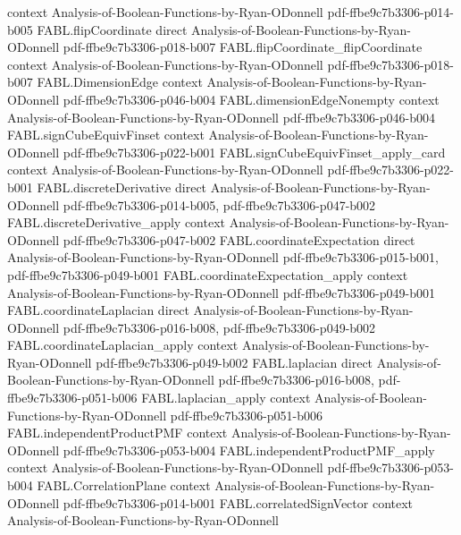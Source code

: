 \begin{theorem}
  {context}
  {Analysis-of-Boolean-Functions-by-Ryan-ODonnell}
  {pdf-ffbe9c7b3306-p014-b005}
\proofstep
  {FABL.flipCoordinate}
  {direct}
  {Analysis-of-Boolean-Functions-by-Ryan-ODonnell}
  {pdf-ffbe9c7b3306-p018-b007}
\proofstep
  {FABL.flipCoordinate_flipCoordinate}
  {context}
  {Analysis-of-Boolean-Functions-by-Ryan-ODonnell}
  {pdf-ffbe9c7b3306-p018-b007}
\proofstep
  {FABL.DimensionEdge}
  {context}
  {Analysis-of-Boolean-Functions-by-Ryan-ODonnell}
  {pdf-ffbe9c7b3306-p046-b004}
\proofstep
  {FABL.dimensionEdgeNonempty}
  {context}
  {Analysis-of-Boolean-Functions-by-Ryan-ODonnell}
  {pdf-ffbe9c7b3306-p046-b004}
\proofstep
  {FABL.signCubeEquivFinset}
  {context}
  {Analysis-of-Boolean-Functions-by-Ryan-ODonnell}
  {pdf-ffbe9c7b3306-p022-b001}
\proofstep
  {FABL.signCubeEquivFinset_apply_card}
  {context}
  {Analysis-of-Boolean-Functions-by-Ryan-ODonnell}
  {pdf-ffbe9c7b3306-p022-b001}
\proofstep
  {FABL.discreteDerivative}
  {direct}
  {Analysis-of-Boolean-Functions-by-Ryan-ODonnell}
  {pdf-ffbe9c7b3306-p014-b005,
    pdf-ffbe9c7b3306-p047-b002}
\proofstep
  {FABL.discreteDerivative_apply}
  {context}
  {Analysis-of-Boolean-Functions-by-Ryan-ODonnell}
  {pdf-ffbe9c7b3306-p047-b002}
\proofstep
  {FABL.coordinateExpectation}
  {direct}
  {Analysis-of-Boolean-Functions-by-Ryan-ODonnell}
  {pdf-ffbe9c7b3306-p015-b001,
    pdf-ffbe9c7b3306-p049-b001}
\proofstep
  {FABL.coordinateExpectation_apply}
  {context}
  {Analysis-of-Boolean-Functions-by-Ryan-ODonnell}
  {pdf-ffbe9c7b3306-p049-b001}
\proofstep
  {FABL.coordinateLaplacian}
  {direct}
  {Analysis-of-Boolean-Functions-by-Ryan-ODonnell}
  {pdf-ffbe9c7b3306-p016-b008,
    pdf-ffbe9c7b3306-p049-b002}
\proofstep
  {FABL.coordinateLaplacian_apply}
  {context}
  {Analysis-of-Boolean-Functions-by-Ryan-ODonnell}
  {pdf-ffbe9c7b3306-p049-b002}
\proofstep
  {FABL.laplacian}
  {direct}
  {Analysis-of-Boolean-Functions-by-Ryan-ODonnell}
  {pdf-ffbe9c7b3306-p016-b008,
    pdf-ffbe9c7b3306-p051-b006}
\proofstep
  {FABL.laplacian_apply}
  {context}
  {Analysis-of-Boolean-Functions-by-Ryan-ODonnell}
  {pdf-ffbe9c7b3306-p051-b006}
\proofstep
  {FABL.independentProductPMF}
  {context}
  {Analysis-of-Boolean-Functions-by-Ryan-ODonnell}
  {pdf-ffbe9c7b3306-p053-b004}
\proofstep
  {FABL.independentProductPMF_apply}
  {context}
  {Analysis-of-Boolean-Functions-by-Ryan-ODonnell}
  {pdf-ffbe9c7b3306-p053-b004}
\proofstep
  {FABL.CorrelationPlane}
  {context}
  {Analysis-of-Boolean-Functions-by-Ryan-ODonnell}
  {pdf-ffbe9c7b3306-p014-b001}
\proofstep
  {FABL.correlatedSignVector}
  {context}
  {Analysis-of-Boolean-Functions-by-Ryan-ODonnell}

\end{theorem}

